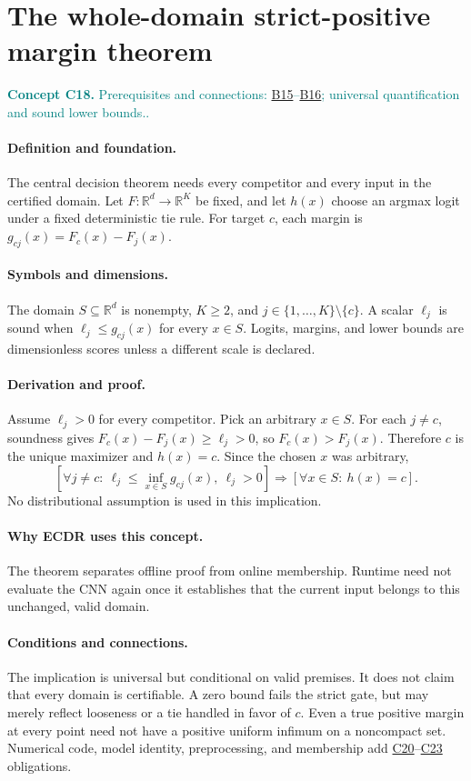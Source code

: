 \documentclass[11pt,a4paper]{article}
\newcommand{\R}{\mathbb R}
\newcommand{\conceptid}{Front matter}
\newcommand{\concept}[3]{\clearpage\renewcommand{\conceptid}{#1}%
\section{#2}\label{concept:#1}%
\textcolor{teal}{\textbf{Concept #1.} Prerequisites and connections: #3.}\par
\typeout{ECDR-CONCEPT-START #1 PAGE=\thepage}}
\begin{document}
\concept{C18}{The whole-domain strict-positive margin theorem}{\hyperref[concept:B15]{B15}--\hyperref[concept:B16]{B16}; universal quantification and sound lower bounds.}
\paragraph{Definition and foundation.}
The central decision theorem needs every competitor and every input in the certified domain. Let $F:\R^d\to\R^K$ be fixed, and let $h(x)$ choose an argmax logit under a fixed deterministic tie rule. For target $c$, each margin is $g_{cj}(x)=F_c(x)-F_j(x)$.
\paragraph{Symbols and dimensions.}
The domain $S\subseteq\R^d$ is nonempty, $K\ge2$, and $j\in\{1,\ldots,K\}\setminus\{c\}$. A scalar $\ell_j$ is sound when $\ell_j\le g_{cj}(x)$ for every $x\in S$. Logits, margins, and lower bounds are dimensionless scores unless a different scale is declared.
\paragraph{Derivation and proof.}
Assume $\ell_j>0$ for every competitor. Pick an arbitrary $x\in S$. For each $j\ne c$, soundness gives $F_c(x)-F_j(x)\ge\ell_j>0$, so $F_c(x)>F_j(x)$. Therefore $c$ is the unique maximizer and $h(x)=c$. Since the chosen $x$ was arbitrary,
\[
 \left[\forall j\ne c:\ \ell_j\le\inf_{x\in S}g_{cj}(x),\ \ell_j>0\right]
 \Longrightarrow\left[\forall x\in S:\ h(x)=c\right].
\]
No distributional assumption is used in this implication.
\paragraph{Why ECDR uses this concept.}
The theorem separates offline proof from online membership. Runtime need not evaluate the CNN again once it establishes that the current input belongs to this unchanged, valid domain.
\paragraph{Conditions and connections.}
The implication is universal but conditional on valid premises. It does not claim that every domain is certifiable. A zero bound fails the strict gate, but may merely reflect looseness or a tie handled in favor of $c$. Even a true positive margin at every point need not have a positive uniform infimum on a noncompact set. Numerical code, model identity, preprocessing, and membership add \hyperref[concept:C20]{C20}--\hyperref[concept:C23]{C23} obligations.
\par\label{endconcept:C18}
\end{document}
